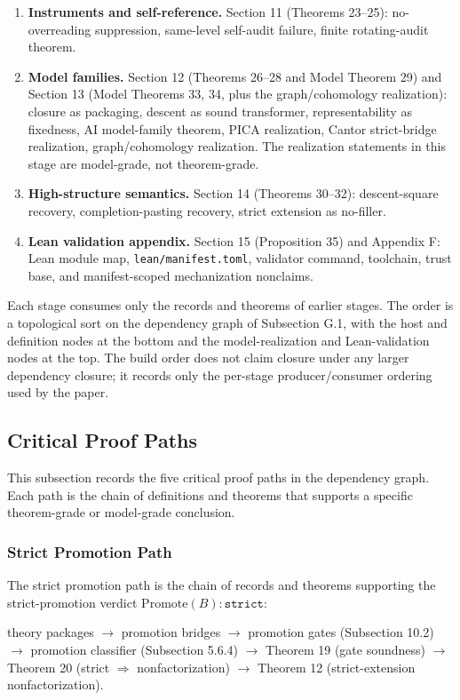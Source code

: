 \documentclass[11pt]{article}
\theoremstyle{definition}
\begin{document}
\begin{enumerate}
\item
  \textbf{Instruments and self-reference.} Section 11 (Theorems 23--25): no-overreading suppression, same-level self-audit failure, finite rotating-audit theorem.
\item
  \textbf{Model families.} Section 12 (Theorems 26--28 and Model Theorem 29) and Section 13 (Model Theorems 33, 34, plus the graph/cohomology realization): closure as packaging, descent as sound transformer, representability as fixedness, AI model-family theorem, PICA realization, Cantor strict-bridge realization, graph/cohomology realization. The realization statements in this stage are model-grade, not theorem-grade.
\item
  \textbf{High-structure semantics.} Section 14 (Theorems 30--32): descent-square recovery, completion-pasting recovery, strict extension as no-filler.
\item
  \textbf{Lean validation appendix.} Section 15 (Proposition 35) and Appendix F: Lean module map, \texttt{lean/manifest.toml}, validator command, toolchain, trust base, and manifest-scoped mechanization nonclaims.
\end{enumerate}

Each stage consumes only the records and theorems of earlier stages. The order is a topological sort on the dependency graph of Subsection G.1, with the host and definition nodes at the bottom and the model-realization and Lean-validation nodes at the top. The build order does not claim closure under any larger dependency closure; it records only the per-stage producer/consumer ordering used by the paper.

\subsection{Critical Proof Paths}

This subsection records the five critical proof paths in the dependency graph. Each path is the chain of definitions and theorems that supports a specific theorem-grade or model-grade conclusion.

\subsubsection{Strict Promotion Path}

The strict promotion path is the chain of records and theorems supporting the strict-promotion verdict \(\mathrm{Promote}(B):\texttt{strict}\):

theory packages \(\to\) promotion bridges \(\to\) promotion gates (Subsection 10.2) \(\to\) promotion classifier (Subsection 5.6.4) \(\to\) Theorem 19 (gate soundness) \(\to\) Theorem 20 (strict \(\Rightarrow\) nonfactorization) \(\to\) Theorem 12 (strict-extension nonfactorization).
\end{document}
